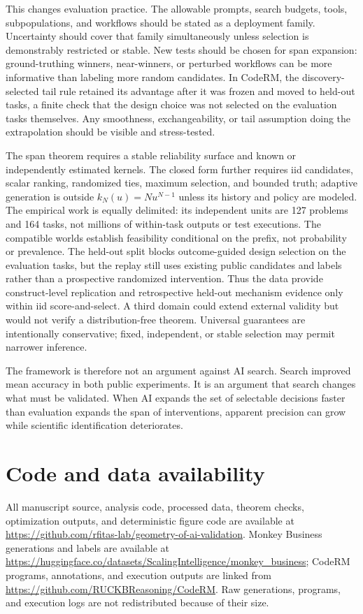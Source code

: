 \documentclass[10pt,twocolumn]{article}
\begin{document}
This changes evaluation practice. The allowable prompts, search budgets, tools, subpopulations, and workflows should be stated as a deployment family. Uncertainty should cover that family simultaneously unless selection is demonstrably restricted or stable. New tests should be chosen for span expansion: ground-truthing winners, near-winners, or perturbed workflows can be more informative than labeling more random candidates. In CodeRM, the discovery-selected tail rule retained its advantage after it was frozen and moved to held-out tasks, a finite check that the design choice was not selected on the evaluation tasks themselves. Any smoothness, exchangeability, or tail assumption doing the extrapolation should be visible and stress-tested.

The span theorem requires a stable reliability surface and known or independently estimated kernels. The closed form further requires iid candidates, scalar ranking, randomized ties, maximum selection, and bounded truth; adaptive generation is outside $k_N(u)=Nu^{N-1}$ unless its history and policy are modeled. The empirical work is equally delimited: its independent units are 127 problems and 164 tasks, not millions of within-task outputs or test executions. The compatible worlds establish feasibility conditional on the prefix, not probability or prevalence. The held-out split blocks outcome-guided design selection on the evaluation tasks, but the replay still uses existing public candidates and labels rather than a prospective randomized intervention. Thus the data provide construct-level replication and retrospective held-out mechanism evidence only within iid score-and-select. A third domain could extend external validity but would not verify a distribution-free theorem. Universal guarantees are intentionally conservative; fixed, independent, or stable selection may permit narrower inference.

The framework is therefore not an argument against AI search. Search improved mean accuracy in both public experiments. It is an argument that search changes what must be validated. When AI expands the set of selectable decisions faster than evaluation expands the span of interventions, apparent precision can grow while scientific identification deteriorates.

\section*{Code and data availability}
All manuscript source, analysis code, processed data, theorem checks, optimization outputs, and deterministic figure code are available at \url{https://github.com/rfitas-lab/geometry-of-ai-validation}. Monkey Business generations and labels are available at \url{https://huggingface.co/datasets/ScalingIntelligence/monkey_business}; CodeRM programs, annotations, and execution outputs are linked from \url{https://github.com/RUCKBReasoning/CodeRM}. Raw generations, programs, and execution logs are not redistributed because of their size.
\end{document}
